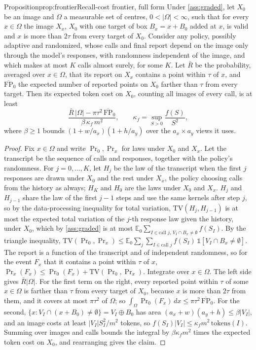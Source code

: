 \begin{restate}{Proposition}{prop:frontier}{Recall-cost frontier, full form}
Under \cref{ass:graded}, let $X_0$ be an image and $\Omega$ a measurable set of centres, $0 < |\Omega| < \infty$, such that for every $x \in \Omega$ the image $X_x$, $X_0$ with one target of box $B_x = x + B_0$ added at $x$, is valid and $x$ is more than $2\tau$ from every target of $X_0$. Consider any policy, possibly adaptive and randomized, whose calls and final report depend on the image only through the model's responses, with randomness independent of the image, and which makes at most $K$ calls almost surely, for some $K$. Let $\bar R$ be the probability, averaged over $x \in \Omega$, that its report on $X_x$ contains a point within $\tau$ of $x$, and $\overline{\mathrm{FP}}_0$ the expected number of reported points on $X_0$ farther than $\tau$ from every target. Then its expected token cost on $X_0$, counting all images of every call, is at least
\[
\frac{\bar R\, |\Omega| - \pi\tau^2\, \overline{\mathrm{FP}}_0}{\beta\, \kappa_f\, m^2}, \qquad \kappa_f = \sup_{S > 0} \frac{f(S)}{S^2},
\]
where $\beta \ge 1$ bounds $(1 + w/a_x)(1 + h/a_y)$ over the $a_x \times a_y$ views it uses.
\end{restate}

\begin{proof}
Fix $x \in \Omega$ and write $\Pr_0, \Pr_x$ for laws under $X_0$ and $X_x$. Let the transcript be the sequence of calls and responses, together with the policy's randomness. For $j = 0, \dots, K$, let $H_j$ be the law of the transcript when the first $j$ responses are drawn under $X_0$ and the rest under $X_x$, the policy choosing calls from the history as always; $H_K$ and $H_0$ are the laws under $X_0$ and $X_x$. $H_j$ and $H_{j-1}$ share the law of the first $j-1$ steps and use the same kernels after step $j$, so by the data-processing inequality for total variation, $\mathrm{TV}(H_j, H_{j-1})$ is at most the expected total variation of the $j$-th response law given the history, under $X_0$, which by \cref{ass:graded} is at most $\mathbb{E}_0 \sum_{I \in \text{call } j,\, V_I \cap B_x \ne \emptyset} f(S_I)$. By the triangle inequality, $\mathrm{TV}(\Pr_0, \Pr_x) \le \mathbb{E}_0 \sum_{j}\sum_{I \in \text{call } j} f(S_I)\,\mathbb{1}[V_I \cap B_x \ne \emptyset]$. The report is a function of the transcript and of independent randomness, so for the event $F_x$ that it contains a point within $\tau$ of $x$, $\Pr_x(F_x) \le \Pr_0(F_x) + \mathrm{TV}(\Pr_0, \Pr_x)$. Integrate over $x \in \Omega$. The left side gives $\bar R|\Omega|$. For the first term on the right, every reported point within $\tau$ of some $x \in \Omega$ is farther than $\tau$ from every target of $X_0$, because $x$ is more than $2\tau$ from them, and it covers at most $\pi\tau^2$ of $\Omega$; so $\int_\Omega \Pr_0(F_x)\,dx \le \pi\tau^2\,\overline{\mathrm{FP}}_0$. For the second, $\{x : V_I \cap (x + B_0) \ne \emptyset\} = V_I \oplus B_0$ has area $(a_x + w)(a_y + h) \le \beta |V_I|$, and an image costs at least $|V_I| S_I^2/m^2$ tokens, so $f(S_I)|V_I| \le \kappa_f m^2\,\mathrm{tokens}(I)$. Summing over images and calls bounds the integral by $\beta\kappa_f m^2$ times the expected token cost on $X_0$, and rearranging gives the claim.
\end{proof}

